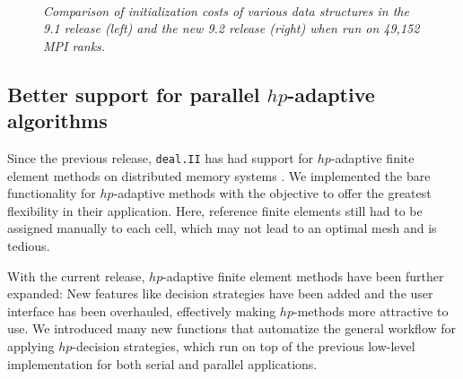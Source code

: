 \documentclass{ansarticle-preprint}
\newcommand{\specialword}[1]{\texttt{#1}}
\newcommand{\dealii}{{\specialword{deal.II}}\xspace}
\begin{document}
\begin{figure}
  \\
  \strut\hfill{}\hfill\strut
  \caption{\it Comparison of initialization costs of various data structures in the 9.1 release (left) and the new 9.2 release (right) when run on 49,152 MPI ranks.}
  \label{fig:init_costs}
\end{figure}






\subsection{Better support for parallel $hp$-adaptive algorithms}
\label{subsec:hp}

Since the previous release, \dealii{} has had support for $hp$-adaptive finite element methods
on distributed memory systems \cite{dealII91}. We implemented the bare functionality
for $hp$-adaptive methods with the objective to offer the greatest flexibility in
their application. Here, reference finite elements still had to be assigned manually
to each cell, which may not lead to an optimal mesh and is tedious.

With the current release, $hp$-adaptive finite element methods have been further
expanded: New features like decision strategies have been added and the user interface
has been overhauled, effectively making $hp$-methods more attractive to use. We introduced
many new functions that automatize the general workflow for applying $hp$-decision
strategies, which run on top of the previous low-level implementation for both serial
and parallel applications.
\end{document}
